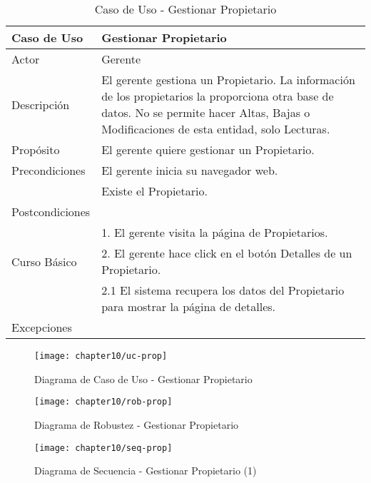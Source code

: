 \begin{table}[H]
    \begin{tabular}{@{} p{3cm} p{10cm} @{}} \toprule
    \textbf{Caso de Uso}    & Gestionar Propietario \\ \midrule
    Actor                   & Gerente \\ \cmidrule{1-2}
    Descripción             & El gerente gestiona un Propietario. La información de los propietarios la proporciona otra base de datos. No se permite hacer Altas, Bajas o Modificaciones de esta entidad, solo Lecturas. \\ \cmidrule{1-2}
    Propósito               & El gerente quiere gestionar un Propietario. \\ \cmidrule{1-2}
    Precondiciones          & El gerente inicia su navegador web. \\ 
                            & Existe el Propietario. \\ \cmidrule{1-2} 
    Postcondiciones         & \\ \cmidrule{1-2} 
                            & 1. El gerente visita la página de Propietarios. \\ 
    Curso Básico            & 2. El gerente hace click en el botón Detalles de un Propietario. \\
                            & 2.1 El sistema recupera los datos del Propietario para mostrar la página de detalles. \\ \cmidrule{1-2}
    Excepciones             & \\ \bottomrule
   \end{tabular}
        \caption{Caso de Uso - Gestionar Propietario}
        \label{tab:tabcu-prop}
\end{table}

    \begin{figure}[H]
        \centering
        \texttt{[image: chapter10/uc-prop]}
        \caption{Diagrama de Caso de Uso - Gestionar Propietario}
        \label{fig:uc-prop}
    \end{figure}

    \begin{figure}[H]
        \centering
        \texttt{[image: chapter10/rob-prop]}
        \caption{Diagrama de Robustez - Gestionar Propietario}
        \label{fig:rob-prop}
    \end{figure}
    \begin{landscape}
        
    \begin{figure}[H]
        \centering
        \texttt{[image: chapter10/seq-prop]}
        \caption{Diagrama de Secuencia - Gestionar Propietario (1) }
        \label{fig:seq-prop}
    \end{figure}
    \end{landscape}
    

